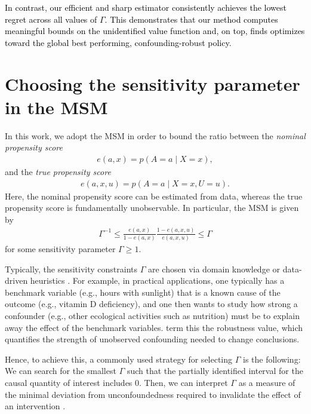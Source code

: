 \documentclass{article} %
\theoremstyle{plain}
\theoremstyle{definition}
\theoremstyle{remark}
\newcommand{\rebuttal}[1]{\textcolor{black}{#1}}
\begin{document}
\rebuttal{In contrast, our efficient and sharp estimator consistently achieves the lowest regret across all values of $\Gamma$. This demonstrates that our method computes meaningful bounds on the unidentified value function and, on top, finds optimizes toward the global best performing, confounding-robust policy.}



\clearpage


\section{Choosing the sensitivity parameter in the MSM}\label{appendix:msm}

In this work, we adopt the MSM \citep{Tan.2006} in order to bound the ratio between the \emph{nominal propensity score}
\begin{align}
e(a,x)=p(A=a\mid X=x), 
\end{align}
and the \emph{true propensity score}
\begin{align}
e(a,x,u)=p(A=a\mid X=x,U=u).
\end{align}
Here, the nominal propensity score can be estimated from data, whereas the true propensity score is fundamentally unobservable. In particular, the MSM is given by
\begin{align}
    \Gamma^{-1} \leq \frac{e(a,x)}{1-e(a,x)}\frac{1-e(a,x,u)}{e(a,x,u)}\leq \Gamma
\end{align}
for some sensitivity parameter $\Gamma \geq 1$.


Typically, the sensitivity constraints $\Gamma$ are chosen via domain knowledge \citep{Frauen.2023c,Kallus.2019} or data-driven heuristics \citep{Hatt.2022b}. For example, in practical applications, one typically has a benchmark variable (e.g., hours with sunlight) that is a known cause of the outcome (e.g., vitamin D deficiency), and one then wants to study how strong a confounder (e.g., other ecological activities such as nutrition) must be to explain away the effect of the benchmark variables. \citep{Cinelli.2020b} term this the robustness value, which quantifies the strength of unobserved confounding needed to change conclusions.

Hence, to achieve this, a commonly used strategy for selecting $\Gamma$ is the following: We can search for the smallest $\Gamma$ such that the partially identified interval for the causal quantity of interest includes $0$. Then, we can interpret $\Gamma$ as a measure of the minimal deviation from unconfoundedness required to invalidate the effect of an intervention \citep{Jesson.2021,Jin.2023}.
\end{document}
